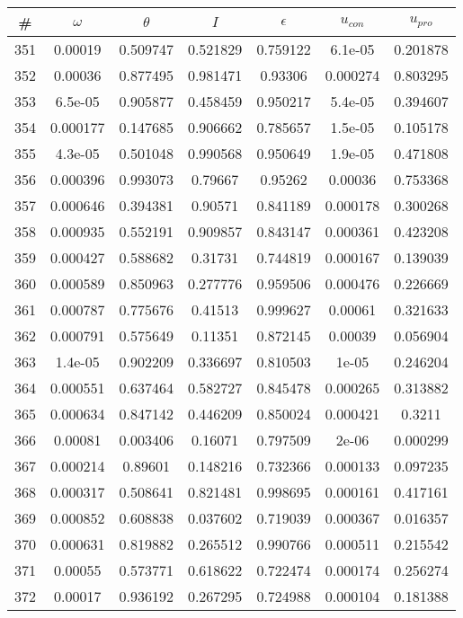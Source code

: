 \newpage
\begin{table}
\begin{tabular}{c|c|c|c|c|c|c}
\# & $\omega$ & $\theta$ & $I$ & $\epsilon$ & $u_{con}$ & $u_{pro}$\\
\hline
351 & 0.00019 & 0.509747 & 0.521829 & 0.759122 & 6.1e-05 & 0.201878\\
352 & 0.00036 & 0.877495 & 0.981471 & 0.93306 & 0.000274 & 0.803295\\
353 & 6.5e-05 & 0.905877 & 0.458459 & 0.950217 & 5.4e-05 & 0.394607\\
354 & 0.000177 & 0.147685 & 0.906662 & 0.785657 & 1.5e-05 & 0.105178\\
355 & 4.3e-05 & 0.501048 & 0.990568 & 0.950649 & 1.9e-05 & 0.471808\\
356 & 0.000396 & 0.993073 & 0.79667 & 0.95262 & 0.00036 & 0.753368\\
357 & 0.000646 & 0.394381 & 0.90571 & 0.841189 & 0.000178 & 0.300268\\
358 & 0.000935 & 0.552191 & 0.909857 & 0.843147 & 0.000361 & 0.423208\\
359 & 0.000427 & 0.588682 & 0.31731 & 0.744819 & 0.000167 & 0.139039\\
360 & 0.000589 & 0.850963 & 0.277776 & 0.959506 & 0.000476 & 0.226669\\
361 & 0.000787 & 0.775676 & 0.41513 & 0.999627 & 0.00061 & 0.321633\\
362 & 0.000791 & 0.575649 & 0.11351 & 0.872145 & 0.00039 & 0.056904\\
363 & 1.4e-05 & 0.902209 & 0.336697 & 0.810503 & 1e-05 & 0.246204\\
364 & 0.000551 & 0.637464 & 0.582727 & 0.845478 & 0.000265 & 0.313882\\
365 & 0.000634 & 0.847142 & 0.446209 & 0.850024 & 0.000421 & 0.3211\\
366 & 0.00081 & 0.003406 & 0.16071 & 0.797509 & 2e-06 & 0.000299\\
367 & 0.000214 & 0.89601 & 0.148216 & 0.732366 & 0.000133 & 0.097235\\
368 & 0.000317 & 0.508641 & 0.821481 & 0.998695 & 0.000161 & 0.417161\\
369 & 0.000852 & 0.608838 & 0.037602 & 0.719039 & 0.000367 & 0.016357\\
370 & 0.000631 & 0.819882 & 0.265512 & 0.990766 & 0.000511 & 0.215542\\
371 & 0.00055 & 0.573771 & 0.618622 & 0.722474 & 0.000174 & 0.256274\\
372 & 0.00017 & 0.936192 & 0.267295 & 0.724988 & 0.000104 & 0.181388\\

\end{tabular}
\end{table}
